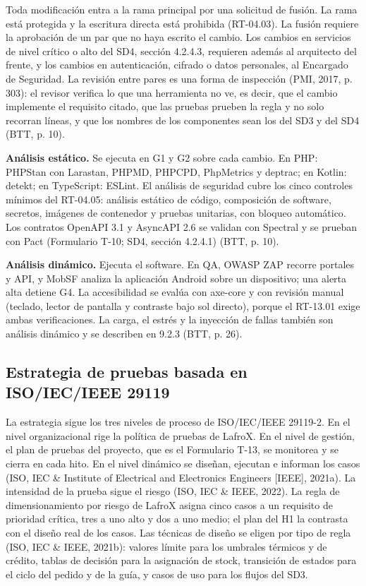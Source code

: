 Toda modificación entra a la rama principal por una solicitud de fusión. La rama está protegida y la escritura directa está prohibida (RT-04.03). La fusión requiere la aprobación de un par que no haya escrito el cambio. Los cambios en servicios de nivel crítico o alto del SD4, sección 4.2.4.3, requieren además al arquitecto del frente, y los cambios en autenticación, cifrado o datos personales, al Encargado de Seguridad. La revisión entre pares es una forma de inspección (PMI, 2017, p. 303): el revisor verifica lo que una herramienta no ve, es decir, que el cambio implemente el requisito citado, que las pruebas prueben la regla y no solo recorran líneas, y que los nombres de los componentes sean los del SD3 y del SD4 (BTT, p. 10).

\textbf{Análisis estático.} Se ejecuta en G1 y G2 sobre cada cambio. En PHP: PHPStan con Larastan, PHPMD, PHPCPD, PhpMetrics y deptrac; en Kotlin: detekt; en TypeScript: ESLint. El análisis de seguridad cubre los cinco controles mínimos del RT-04.05: análisis estático de código, composición de software, secretos, imágenes de contenedor y pruebas unitarias, con bloqueo automático. Los contratos OpenAPI 3.1 y AsyncAPI 2.6 se validan con Spectral y se prueban con Pact (Formulario T-10; SD4, sección 4.2.4.1) (BTT, p. 10).

\textbf{Análisis dinámico.} Ejecuta el software. En QA, OWASP ZAP recorre portales y API, y MobSF analiza la aplicación Android sobre un dispositivo; una alerta alta detiene G4. La accesibilidad se evalúa con axe-core y con revisión manual (teclado, lector de pantalla y contraste bajo sol directo), porque el RT-13.01 exige ambas verificaciones. La carga, el estrés y la inyección de fallas también son análisis dinámico y se describen en 9.2.3 (BTT, p. 26).

\subsection{Estrategia de pruebas basada en ISO/IEC/IEEE 29119}

La estrategia sigue los tres niveles de proceso de ISO/IEC/IEEE 29119-2. En el nivel organizacional rige la política de pruebas de LafroX. En el nivel de gestión, el plan de pruebas del proyecto, que es el Formulario T-13, se monitorea y se cierra en cada hito. En el nivel dinámico se diseñan, ejecutan e informan los casos (ISO, IEC \& Institute of Electrical and Electronics Engineers [IEEE], 2021a). La intensidad de la prueba sigue el riesgo (ISO, IEC \& IEEE, 2022). La regla de dimensionamiento por riesgo de LafroX asigna cinco casos a un requisito de prioridad crítica, tres a uno alto y dos a uno medio; el plan del H1 la contrasta con el diseño real de los casos. Las técnicas de diseño se eligen por tipo de regla (ISO, IEC \& IEEE, 2021b): valores límite para los umbrales térmicos y de crédito, tablas de decisión para la asignación de stock, transición de estados para el ciclo del pedido y de la guía, y casos de uso para los flujos del SD3.

